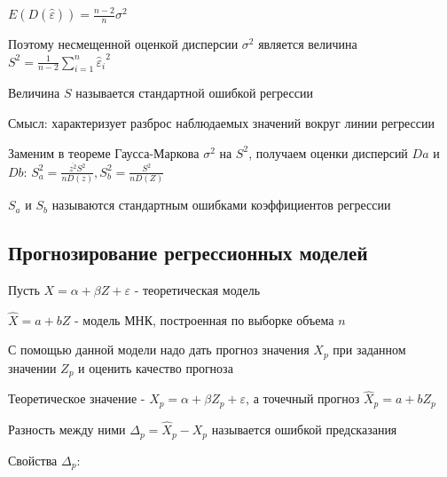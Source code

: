\documentclass[12pt]{article}
\begin{document}
$E(D(\hat \varepsilon)) = \frac{n - 2}{n} \sigma^2$

Поэтому несмещенной оценкой дисперсии $\sigma^2$ является величина $S^2 = \frac{1}{n - 2} \sum_{i = 1}^n {\hat \varepsilon_i}^2$

\Def Величина $S$ называется стандартной ошибкой регрессии

Смысл: характеризует разброс наблюдаемых значений вокруг линии регрессии

\Nota Заменим в теореме Гаусса-Маркова $\sigma^2$ на $S^2$, получаем оценки дисперсий $Da$ и $Db$: $S_a^2 = \frac{\overline{z^2} S^2}{n D(z)}, S^2_b = \frac{S^2}{n D(Z)}$

\Def $S_a$ и $S_b$ называются стандартным ошибками коэффициентов регрессии

\subsection{Прогнозирование регрессионных моделей}

Пусть $X = \alpha + \beta Z + \varepsilon$ - теоретическая модель

$\hat X = a + b Z$ - модель МНК, построенная по выборке объема $n$

С помощью данной модели надо дать прогноз значения $X_p$ при заданном значении $Z_p$ и оценить качество прогноза 

Теоретическое значение - $X_p = \alpha + \beta Z_p + \varepsilon$, а точечный прогноз $\hat X_p = a + b Z_p$

Разность между ними $\Delta_p = \hat X_p - X_p$ называется ошибкой предсказания

Свойства $\Delta_p$:
\end{document}
